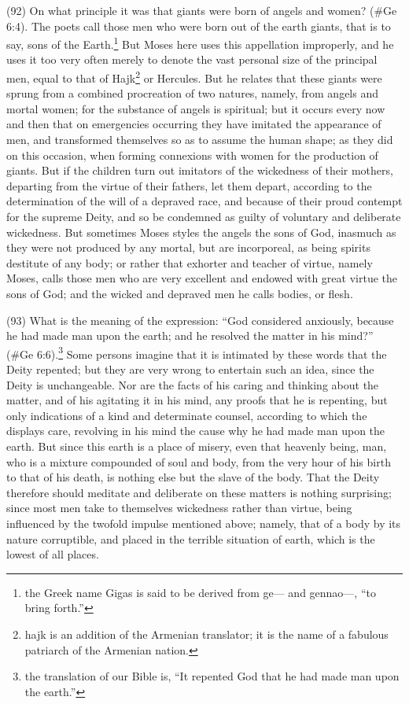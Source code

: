 (92) On what principle it was that giants were born of angels and women? (\#Ge 6:4). The
poets call those men who were born out of the earth giants, that is to say, sons of the Earth.\footnote{the
Greek name Gigas is said to be derived from ge— and gennao—, ``to bring forth.''} But Moses here uses this
appellation improperly, and he uses it too very often merely to denote the vast personal size of the
principal men, equal to that of Hajk\footnote{hajk is an addition of the Armenian translator; it is the name of a fabulous
patriarch of the Armenian nation.} or Hercules. But he relates that these giants were sprung from a
combined procreation of two natures, namely, from angels and mortal women; for the substance of
angels is spiritual; but it occurs every now and then that on emergencies occurring they have
imitated the appearance of men, and transformed themselves so as to assume the human shape;
as they did on this occasion, when forming connexions with women for the production of giants. But
if the children turn out imitators of the wickedness of their mothers, departing from the virtue of
their fathers, let them depart, according to the determination of the will of a depraved race, and
because of their proud contempt for the supreme Deity, and so be condemned as guilty of
voluntary and deliberate wickedness. But sometimes Moses styles the angels the sons of God,
inasmuch as they were not produced by any mortal, but are incorporeal, as being spirits destitute
of any body; or rather that exhorter and teacher of virtue, namely Moses, calls those men who are
very excellent and endowed with great virtue the sons of God; and the wicked and depraved men
he calls bodies, or flesh.

(93) What is the meaning of the expression: ``God considered anxiously, because he had made
man upon the earth; and he resolved the matter in his mind?'' (\#Ge 6:6).\footnote{the translation of our
Bible is, ``It repented God that he had made man upon the earth.''} Some persons imagine that it is intimated by
these words that the Deity repented; but they are very wrong to entertain such an idea, since the
Deity is unchangeable. Nor are the facts of his caring and thinking about the matter, and of his
agitating it in his mind, any proofs that he is repenting, but only indications of a kind and
determinate counsel, according to which the displays care, revolving in his mind the cause why he
had made man upon the earth. But since this earth is a place of misery, even that heavenly being,
man, who is a mixture compounded of soul and body, from the very hour of his birth to that of his
death, is nothing else but the slave of the body. That the Deity therefore should meditate and
deliberate on these matters is nothing surprising; since most men take to themselves wickedness
rather than virtue, being influenced by the twofold impulse mentioned above; namely, that of a body
by its nature corruptible, and placed in the terrible situation of earth, which is the lowest of all
places.

